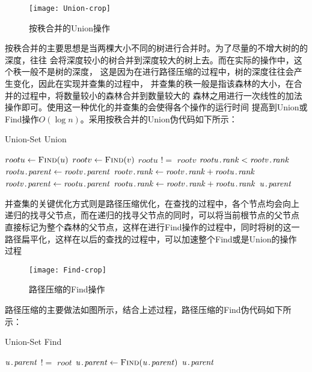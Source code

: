 \begin{figure}[htbp]
\centering\texttt{[image: Union-crop]}
\caption{按秩合并的Union操作}\label{fig:Union}
\end{figure}
按秩合并的主要思想是当两棵大小不同的树进行合并时。为了尽量的不增大树的的深度，往往
会将深度较小的树合并到深度较大的树上去。而在实际的操作中，这个秩一般不是树的深度，
这是因为在进行路径压缩的过程中，树的深度往往会产生变化，因此在实现并查集的过程中，
并查集的秩一般是指该森林的大小，在合并的过程中，将数量较小的森林合并到数量较大的
森林之用进行一次线性的加法操作即可。使用这一种优化的并查集的会使得各个操作的运行时间
提高到Union或Find操作$O(\log n)$。采用按秩合并的Union伪代码如下所示：
\begin{algorithm} 
	\caption {Union-Set Union} 
	\begin{codebox}
\li			$rootu \leftarrow \textnormal{\scshape Find}(u)$
\li			$rootv \leftarrow \textnormal{\scshape Find}(v)$
\li			\If	$rootu$ $!=$ $rootv$
\li				\Then
					\If $\attribii{rootu}{rank} < \attribii{rootv}{rank}$
\li						\Then
							$\attribii{rootu}{parent} \leftarrow \attribii{rootv}{parent}$
\li							$\attribii{rootv}{rank} \leftarrow \attribii{rootv}{rank} + \attribii{rootu}{rank}$
\li						\Else
\li							$\attribii{rootv}{parent} \leftarrow \attribii{rootu}{parent}$
\li							$\attribii{rootu}{rank} \leftarrow  \attribii{rootv}{rank} + \attribii{rootu}{rank}$
						\End
				\End
\li			\Return	$\attribii{u}{parent}$
	\end{codebox}
\end{algorithm} 

并查集的关键优化方式则是路径压缩优化，在查找的过程中，各个节点均会向上
递归的找寻父节点，而在递归的找寻父节点的同时，可以将当前根节点的父节点
直接标记为整个森林的父节点，这样在进行Find操作的过程中，同时将树的这一
路径扁平化，这样在以后的查找的过程中，可以加速整个Find或是Union的操作
过程
\begin{figure}[htbp]
\centering\texttt{[image: Find-crop]}
\caption{路径压缩的Find操作}\label{fig:Find}
\end{figure}

路径压缩的主要做法如图所示，结合上述过程，路径压缩的Find伪代码如下所示：
\begin{algorithm} 
	\caption {Union-Set Find} 
	\begin{codebox}
		\Procname{$\proc{Find}(u)$}
\li			\If $\attribii{u}{parent}$ $!=$ $root$
\li			\Then	$\attribii{u}{parent} \leftarrow \proc{Find}(\attribii{u}{parent})$ \End
\li			\Return	$\attribii{u}{parent}$
	\end{codebox}
\end{algorithm} 

